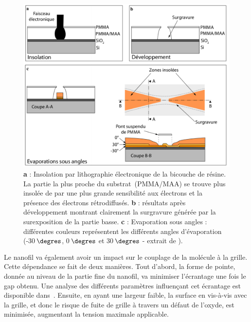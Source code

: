 \begin{figure}[h!]
\centering \includegraphics[scale=0.45]{Fabrication/EvapAngle/EvapAngle.pdf}
\caption{\textbf{a} : Insolation par lithographie électronique de la bicouche de résine. La partie la plus proche du substrat~(PMMA/MAA) se trouve plus insolée de par une plus grande sensibilité aux électrons et la présence des électrons rétrodiffusés. \textbf{b} : résultats après développement montrant clairement la surgravure générée par la surexposition de la partie basse. \textbf{c} : Evaporation sous angles : différentes couleurs représentent les différents angles d'évaporation (-30$\,\degres$, 0$\,\degres$ et 30$\,\degres$ - extrait de \cite{RochPhd}).}
\label{EvapAngle}
\end{figure}

Le nanofil va également avoir un impact sur le couplage de la molécule à la grille. Cette dépendance se fait de deux manières. Tout d'abord, la forme de pointe, donnée au niveau de la partie fine du nanofil, va minimiser l'écrantage une fois le gap obtenu. Une analyse des différents paramètres influençant cet écrantage est disponible dans~\cite{Datta2009}. Ensuite, en ayant une largeur faible, la surface en vis-à-vis avec la grille, et donc le risque de fuite de grille à travers un défaut de l'oxyde, est minimisée, augmentant la tension maximale applicable.

